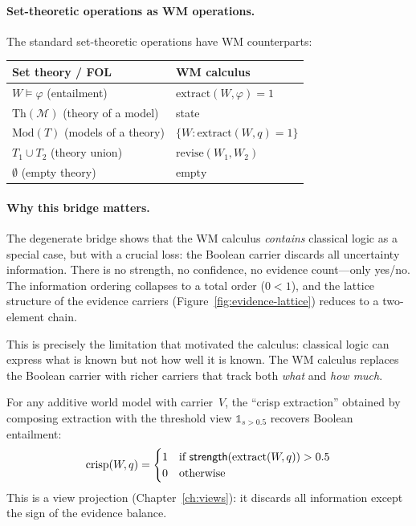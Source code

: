\paragraph{Set-theoretic operations as WM operations.}
The standard set-theoretic operations have WM counterparts:
\begin{center}
\begin{tabular}{ll}
\toprule
\textbf{Set theory / FOL} & \textbf{WM calculus} \\
\midrule
$W \models \varphi$ (entailment) & $\mathrm{extract}(W, \varphi) = 1$ \\
$\mathrm{Th}(\mathcal{M})$ (theory of a model) & state \\
$\mathrm{Mod}(T)$ (models of a theory) & $\{W : \mathrm{extract}(W,q)=1\}$ \\
$T_1 \cup T_2$ (theory union) & $\mathrm{revise}(W_1, W_2)$ \\
$\emptyset$ (empty theory) & $\mathrm{empty}$ \\
\bottomrule
\end{tabular}
\end{center}

\paragraph{Why this bridge matters.}
The degenerate bridge shows that the WM calculus \emph{contains}
classical logic as a special case, but with a crucial loss: the
Boolean carrier discards all uncertainty information.  There is no
strength, no confidence, no evidence count---only yes/no.
The information ordering collapses to a total order ($0 < 1$), and
the lattice structure of the evidence carriers (Figure~\ref{fig:evidence-lattice})
reduces to a two-element chain.

This is precisely the limitation that motivated the calculus:
classical logic can express what is known but not how well it is
known.  The WM calculus replaces the Boolean carrier with richer
carriers that track both \emph{what} and \emph{how much}.

\begin{proposition}
\label{prop:crisp}
For any additive world model with carrier~$V$, the ``crisp
extraction'' obtained by composing extraction with the threshold
view $\mathbb{1}_{s > 0.5}$ recovers Boolean entailment:
\[
  \mathrm{crisp}(W, q) = \begin{cases}
    1 & \text{if } \mathsf{strength}(\mathrm{extract}(W, q)) > 0.5 \\
    0 & \text{otherwise}
  \end{cases}
\]
This is a view projection (Chapter~\ref{ch:views}): it discards
all information except the sign of the evidence balance.
\end{proposition}



